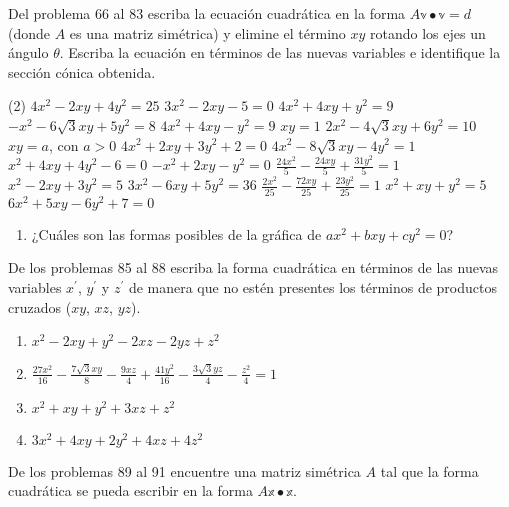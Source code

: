 \newpage\noindent
Del problema 66 al 83 escriba la ecuación cuadrática en la forma $A \mathbb{v} \bullet \mathbb{v}=d$ (donde $A$ es una matriz simétrica) y elimine el término $x y$ rotando los ejes un ángulo $\theta$. Escriba la ecuación en términos de las nuevas variables e identifique la sección cónica obtenida.
\begin{tasks}[
    style=enumerate,
    label-offset = 3mm,
    start=66,
    ](2)
    \task $4 x^{2}-2 x y+4 y^{2}=25$
    \task $3 x^{2}-2 x y-5=0$
    \task $4 x^{2}+4 x y+y^{2}=9$
    \task $-x^{2}-6 \sqrt{3} x y+5 y^{2}=8$
    \task $4 x^{2}+4 x y-y^{2}=9$
    \task $x y=1$
    \task $2 x^{2}-4 \sqrt{3} x y+6 y^{2}=10$
    \task $x y=a$, con $a>0$
    \task $4 x^{2}+2 x y+3 y^{2}+2=0$
    \task $4 x^{2}-8 \sqrt{3} x y-4 y^{2}=1$
    \task $x^{2}+4 x y+4 y^{2}-6=0$
    \task $-x^{2}+2 x y-y^{2}=0$
    \task $\displaystyle\frac{24 x^{2}}{5}-\frac{24 x y}{5}+\frac{31 y^{2}}{5}=1$
    \task $x^{2}-2 x y+3 y^{2}=5$
    \task $3 x^{2}-6 x y+5 y^{2}=36$
    \task $\displaystyle\frac{2 x^{2}}{25}-\frac{72 x y}{25}+\frac{23 y^{2}}{25}=1$
    \task $x^{2}+x y+y^{2}=5$
    \task $6 x^{2}+5 x y-6 y^{2}+7=0$
\end{tasks}
\begin{enumerate}[start=84]
    \item ¿Cuáles son las formas posibles de la gráfica de $a x^{2}+b x y+c y^{2}=0$?
\end{enumerate}
De los problemas 85 al 88 escriba la forma cuadrática en términos de las nuevas variables $x^{\prime}$, $y^{\prime}$ y $z^{\prime}$ de manera que no estén presentes los términos de productos cruzados ($x y$, $x z$, $y z$).
\begin{enumerate}[resume]
    \item $x^{2}-2 x y+y^{2}-2 x z-2 y z+z^{2}$
    \item $\displaystyle\frac{27 x^{2}}{16}-\frac{7 \sqrt{3} x y}{8}-\frac{9 x z}{4}+\frac{41 y^{2}}{16}-\frac{3 \sqrt{3} y z}{4}-\frac{z^{2}}{4}=1$
    \item $x^{2}+x y+y^{2}+3 x z+z^{2}$
    \item $3 x^{2}+4 x y+2 y^{2}+4 x z+4 z^{2}$
\end{enumerate}
De los problemas 89 al 91 encuentre una matriz simétrica $A$ tal que la forma cuadrática se pueda escribir en la forma $A \mathbb{x} \bullet \mathbb{x}$.
